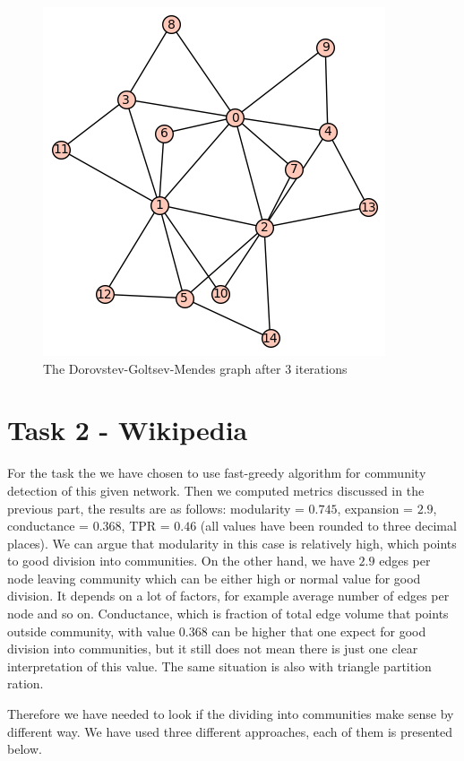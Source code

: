\documentclass[paper=a4, fontsize=11pt]{scrartcl} %
\begin{document}
\begin{figure}[htbp]
   \centering
   \includegraphics{dgm} %
   \caption{The Dorovstev-Goltsev-Mendes graph after $3$ iterations}
   \label{dgm}
\end{figure}

\section{Task 2 - Wikipedia}

For the task the we have chosen to use fast-greedy algorithm for community detection of this given network. Then we computed metrics discussed in the previous part, the results are as follows: modularity = $0.745$, expansion = $2.9$, conductance = $0.368$, TPR = $0.46$ (all values have been rounded to three decimal places). We can argue that modularity in this case is relatively high, which points to good division into communities. On the other hand, we have $2.9$ edges per node leaving community which can be either high or normal value for good division. It depends on a lot of factors, for example average number of edges per node and so on. Conductance, which is fraction of total edge volume that points outside community, with value $0.368$ can be higher that one expect for good division into communities, but it still does not mean there is just one clear interpretation of this value. The same situation is also with triangle partition ration.

Therefore we have needed to look if the dividing into communities make sense by different way. We have used three different approaches, each of them is presented below.
\end{document}
